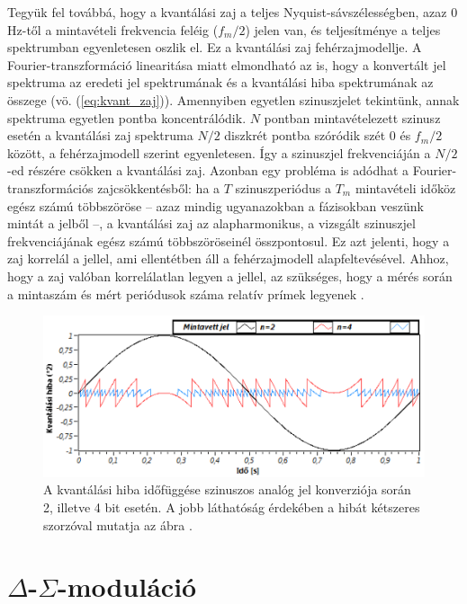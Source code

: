 \documentclass[12pt]{article}
\theoremstyle{plain}
\begin{document}
Tegyük fel továbbá, hogy a kvantálási zaj a teljes Nyquist-sávszélességben, azaz 0 Hz-től a mintavételi frekvencia feléig ($f_m/2$) jelen van, és teljesítménye a teljes spektrumban egyenletesen oszlik el. Ez a kvantálási zaj fehérzajmodellje. A Fourier-transzformáció linearitása miatt elmondható az is, hogy a konvertált jel spektruma az eredeti jel spektrumának és a kvantálási hiba spektrumának az összege (vö. (\ref{eq:kvant_zaj})). Amennyiben egyetlen szinuszjelet tekintünk, annak spektruma egyetlen pontba koncentrálódik. $N$ pontban mintavételezett szinusz esetén a kvantálási zaj spektruma $N/2$ diszkrét pontba szóródik szét 0 és $f_m/2$ között, a fehérzajmodell szerint egyenletesen. Így a szinuszjel frekvenciáján a $N/2$-ed részére csökken a kvantálási zaj. Azonban egy probléma is adódhat a Fourier-transzformációs zajcsökkentésből: ha a $T$ szinuszperiódus a $T_m$ mintavételi időköz egész számú többszöröse -- azaz mindig ugyanazokban a fázisokban veszünk mintát a jelből --, a kvantálási zaj az alapharmonikus, a vizsgált szinuszjel frekvenciájának egész számú többszöröseinél összpontosul. Ez azt jelenti, hogy a zaj korrelál a jellel, ami ellentétben áll a fehérzajmodell alapfeltevésével. Ahhoz, hogy a zaj valóban korrelálatlan legyen a jellel, az szükséges, hogy a mérés során a mintaszám és mért periódusok száma relatív prímek legyenek \cite{BME}.


\begin{figure}
	\centering
	\includegraphics[width=1\linewidth]{media/kvantalasi_hiba}
	\caption{A kvantálási hiba időfüggése szinuszos analóg jel konverziója során 2, illetve 4 bit esetén. A jobb láthatóság érdekében a hibát kétszeres szorzóval mutatja az ábra \cite{BME}.}
	\label{fig:kvantalasihiba}
\end{figure}



\section{$\Delta$-$\Sigma$-moduláció \cite{BME}}
\end{document}
